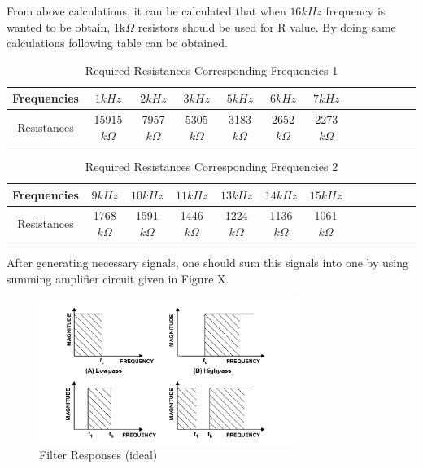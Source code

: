 \documentclass[letterpaper,12pt]{article}
\begin{document}
From above calculations, it can be calculated that when \(16kHz\) frequency is wanted to be obtain, 1k\(\Omega \) resistors should be used for R value. By doing same calculations following table can be obtained.
\begin{table}[H]
    \begin{center}
        \caption{Required Resistances Corresponding Frequencies 1}
        \vspace{2mm}
        \begin{tabular}{||c | c | c | c| c| c| c| c| c| c| c| c| c||} 
            \hline
            Frequencies &\(1kHz\) & \(2kHz\) & \(3kHz\)& \(5kHz\)& \(6kHz\)& \(7kHz\)\\ [0.5ex] 
            \hline\hline
            Resistances &15915\(k\Omega\) & 7957\(k\Omega\) & 5305\(k\Omega\)& 3183\(k\Omega\)& 2652\(k\Omega\)& 2273\(k\Omega\)\\
            \hline
        \end{tabular}
    \end{center}
\end{table}  
\begin{table}[H]
    \begin{center}
        \caption{Required Resistances Corresponding Frequencies 2}
        \vspace{2mm}
        \begin{tabular}{||c | c | c | c| c| c| c| c| c| c| c| c| c||} 
            \hline
            Frequencies &\(9kHz\)& \(10kHz\)& \(11kHz\)& \(13kHz\)& \(14kHz\)& \(15kHz\)\\ [0.5ex] 
            \hline\hline
            Resistances &1768\(k\Omega\)& 1591\(k\Omega\)& 1446\(k\Omega\)& 1224\(k\Omega\)& 1136\(k\Omega\)& 1061\(k\Omega\)\\
            \hline
        \end{tabular}
    \end{center}
\end{table}  

After generating necessary signals, one should sum this signals into one by using summing amplifier circuit given in Figure X. 
\begin{figure}[H]
    \centering
    \includegraphics[width = 0.75\textwidth]{bandpass.png}
    \caption{Filter Responses (ideal)}
\end{figure} 
\end{document}
